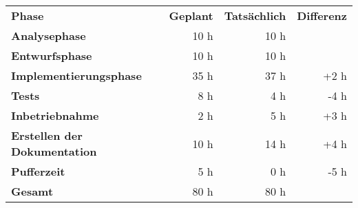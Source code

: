 \begin{tabular}{lrrr}
\rowcolor{heading}\textbf{Phase} & \textbf{Geplant} & \textbf{Tatsächlich} & \textbf{Differenz} \\
\textbf{Analysephase} & 10 h  & 10 h \\
\rowcolor{odd}\textbf{Entwurfsphase} & 10 h  & 10 h \\
\textbf{Implementierungsphase} & 35 h  & 37 h  & +2 h \\
\rowcolor{odd}\textbf{Tests} & 8 h  & 4 h  &  -4 h \\
\textbf{Inbetriebnahme} & 2 h   & 5 h  &  +3 h \\
\rowcolor{odd}\textbf{Erstellen der Dokumentation} & 10 h  & 14 h  & +4 h \\
\textbf{Pufferzeit} & 5 h  & 0 h   & -5 h \\
\hline
\hline
\rowcolor{odd}\textbf{Gesamt} & 80 h  & 80 h  &  \\
\end{tabular}
